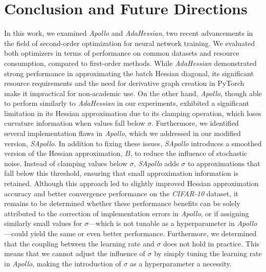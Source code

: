 
\chapter{Conclusion and Future Directions}
In this work, we examined \emph{Apollo} and \emph{AdaHessian}, two recent advancements in the field of second-order optimization for neural network training.
We evaluated both optimizers in terms of performance on common datasets and resource consumption,
compared to first-order methods. While \emph{AdaHessian} demonstrated strong performance in approximating the batch Hessian diagonal,
its significant resource requirements and the need for derivative graph creation in PyTorch make it impractical for non-academic use. 
On the other hand, \emph{Apollo}, though able to perform similarly to \emph{AdaHessian} in our experiments,
exhibited a significant limitation in its Hessian approximation due to its clamping operation,
which loses curvature information when values fall below $\sigma$.
Furthermore, we identified several implementation flaws in \emph{Apollo}, which we addressed in our modified version,
\emph{SApollo}.
In addition to fixing these issues, \emph{SApollo} introduces a smoothed version of the Hessian approximation,
$B$, to reduce the influence of stochastic noise. Instead of clamping values below $\sigma$, \emph{SApollo} adds $\sigma$ to approximations
that fall below this threshold, ensuring that small approximation information is retained.
Although this approach led to slightly improved Hessian approximation accuracy and better convergence performance
on the \emph{CIFAR-10} dataset, it remains to be determined whether these performance benefits can be
solely attributed to the correction of implementation errors in \emph{Apollo}, or if assigning similarly small values
for $\sigma$—which is not tunable as a hyperparameter in \emph{Apollo}—could yield the same or even better performance.
Furthermore, we determined that the coupling between the learning rate and $\sigma$ does not hold in practice.
This means that we cannot adjust the influence of $\sigma$ by simply tuning the learning rate in \emph{Apollo},
making the introduction of $\sigma$ as a hyperparameter a necessity.



